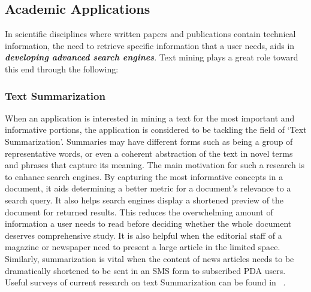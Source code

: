 \documentclass[a4,12pt]{report}
\begin{document}
\subsection{Academic Applications} 
	In scientific disciplines where written papers and publications contain technical information, the need to retrieve
	specific information that a user needs, aids in \textbf{\em developing advanced search engines}. 
	Text mining plays a great role toward this end through the following:
	\subsubsection{Text Summarization} 
		When an application is interested in mining a text for the most important and informative portions,
		the application is considered to be tackling the field of `Text Summarization'. Summaries may have different forms such as being 
		a group of representative words, or even a coherent abstraction of the text in novel terms and phrases that capture its meaning. 
		The main motivation
		for such a research is to enhance search engines. By capturing the most informative concepts in a document, it aids determining a 
		better metric for a document's relevance to a search query. It also helps search engines display a shortened preview of the document for returned
		results. This reduces the overwhelming amount of information a user needs to read before deciding whether the whole document deserves
		comprehensive study. It is also helpful when the editorial staff of a magazine or newspaper need to present a large article in the limited space.
		Similarly, summarization is vital when the content of 
		news articles needs to be dramatically shortened to be sent in an SMS form to subscribed PDA users. 
		Useful surveys of current research on text Summarization can be
		found in ~\cite{Radev:02,Das:07}.
\end{document}
